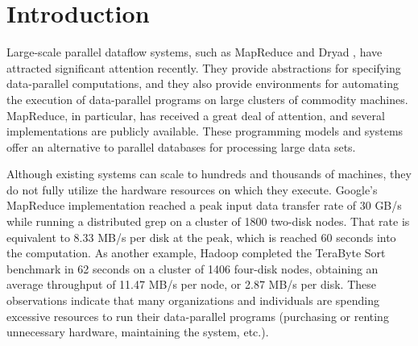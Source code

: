\documentclass{acm_proc_article-sp}
\begin{document}



\section{Introduction}
Large-scale parallel dataflow systems, such as MapReduce \cite{mapreduce} and Dryad \cite{dryad}, have attracted significant attention recently. They provide abstractions for specifying data-parallel computations, and they also provide environments for automating the execution of data-parallel programs on large clusters of commodity machines. MapReduce, in particular, has received a great deal of attention, and several implementations \cite{hadoop, phoenix} are publicly available. These programming models and systems offer an alternative to parallel databases \cite{paralleldatabases} for processing large data sets.

Although existing systems can scale to hundreds and thousands of machines, they do not fully utilize the hardware resources on which they execute. Google's MapReduce implementation reached a peak input data transfer rate of 30 GB/s while running a distributed grep on a cluster of 1800 two-disk nodes. That rate is equivalent to 8.33 MB/s per disk at the peak, which is reached 60 seconds into the computation. As another example, Hadoop completed \cite{hadoop2009} the TeraByte Sort benchmark \cite{sortbenchmark} in 62 seconds on a cluster of 1406 four-disk nodes, obtaining an average throughput of 11.47 MB/s per node, or 2.87 MB/s per disk. These observations indicate that many organizations and individuals are spending excessive resources to run their data-parallel programs (purchasing or renting unnecessary hardware, maintaining the system, etc.).
\end{document}
